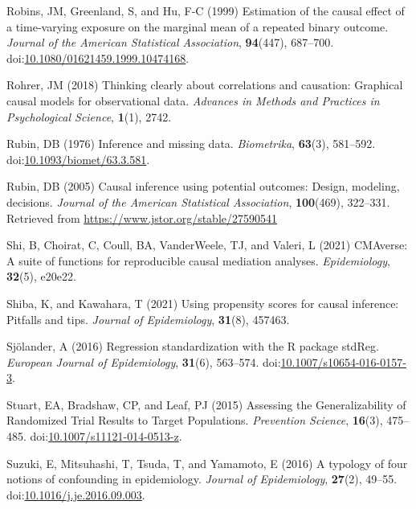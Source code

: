 \documentclass[
  singlecolumn]{article}
\newlength{\cslhangindent}
\newenvironment{CSLReferences}[2] %
 {\begin{list}{}{%
  \setlength{\itemindent}{0pt}
  \setlength{\leftmargin}{0pt}
  \setlength{\parsep}{0pt}
  \ifodd #1
   \setlength{\leftmargin}{\cslhangindent}
   \setlength{\itemindent}{-1\cslhangindent}
  \fi
  \setlength{\itemsep}{#2\baselineskip}}}
 {\end{list}}
\begin{document}
\begin{CSLReferences}{1}{0}
Robins, JM, Greenland, S, and Hu, F-C (1999) Estimation of the causal
effect of a time-varying exposure on the marginal mean of a repeated
binary outcome. \emph{Journal of the American Statistical Association},
\textbf{94}(447), 687--700.
doi:\href{https://doi.org/10.1080/01621459.1999.10474168}{10.1080/01621459.1999.10474168}.

Rohrer, JM (2018) Thinking clearly about correlations and causation:
Graphical causal models for observational data. \emph{Advances in
Methods and Practices in Psychological Science}, \textbf{1}(1), 2742.

Rubin, DB (1976) Inference and missing data. \emph{Biometrika},
\textbf{63}(3), 581--592.
doi:\href{https://doi.org/10.1093/biomet/63.3.581}{10.1093/biomet/63.3.581}.

Rubin, DB (2005) Causal inference using potential outcomes: Design,
modeling, decisions. \emph{Journal of the American Statistical
Association}, \textbf{100}(469), 322--331. Retrieved from
\url{https://www.jstor.org/stable/27590541}

Shi, B, Choirat, C, Coull, BA, VanderWeele, TJ, and Valeri, L (2021)
CMAverse: A suite of functions for reproducible causal mediation
analyses. \emph{Epidemiology}, \textbf{32}(5), e20e22.

Shiba, K, and Kawahara, T (2021) Using propensity scores for causal
inference: Pitfalls and tips. \emph{Journal of Epidemiology},
\textbf{31}(8), 457463.

Sjölander, A (2016) Regression standardization with the R package
stdReg. \emph{European Journal of Epidemiology}, \textbf{31}(6),
563--574.
doi:\href{https://doi.org/10.1007/s10654-016-0157-3}{10.1007/s10654-016-0157-3}.

Stuart, EA, Bradshaw, CP, and Leaf, PJ (2015) Assessing the
Generalizability of Randomized Trial Results to Target Populations.
\emph{Prevention Science}, \textbf{16}(3), 475--485.
doi:\href{https://doi.org/10.1007/s11121-014-0513-z}{10.1007/s11121-014-0513-z}.

Suzuki, E, Mitsuhashi, T, Tsuda, T, and Yamamoto, E (2016) A typology of
four notions of confounding in epidemiology. \emph{Journal of
Epidemiology}, \textbf{27}(2), 49--55.
doi:\href{https://doi.org/10.1016/j.je.2016.09.003}{10.1016/j.je.2016.09.003}.


\end{CSLReferences}
\end{document}
